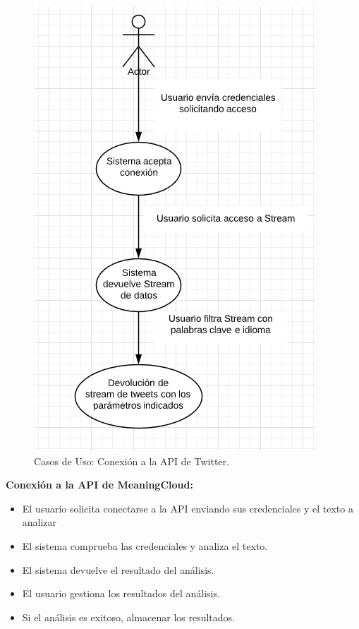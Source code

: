 \begin{figure}[H]
	\centering
	\includegraphics[scale=.4]{imagenes/casoUso1.png}
	\caption{Casos de Uso: Conexión a la API de Twitter.}
	\label{fig:casoUso1}
\end{figure}

\textbf{Conexión a la API de MeaningCloud:}
\begin{itemize}
	\item El usuario solicita conectarse a la API enviando sus credenciales y el texto a analizar
	\item El sistema comprueba las credenciales y analiza el texto. 
	\item El sistema devuelve el resultado del análisis. 
	\item El usuario gestiona los resultados del análisis. 
	\item Si el análisis es exitoso, almacenar los resultados.  
\end{itemize}

